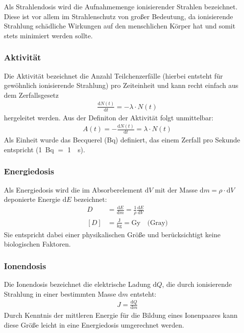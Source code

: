 \documentclass[11pt, a4paper]{article}
\numberwithin{equation}{section}
\begin{document}
Als Strahlendosis wird die Aufnahmemenge ionisierender Strahlen bezeichnet.
Diese ist vor allem im Strahlenschutz von großer Bedeutung, da ionisierende Strahlung schädliche Wirkungen auf den menschlichen Körper hat und somit stets minimiert werden sollte.

\subsubsection{Aktivität}
Die Aktivität bezeichnet die Anzahl Teilchenzerfälle (hierbei entsteht für gewöhnlich ionisierende Strahlung) pro Zeiteinheit und kann recht einfach aus dem Zerfallsgesetz
\begin{align}
	\frac{\mathrm{d} N(t)}{\mathrm{d} t} = - \lambda \cdot N(t)
\end{align}
hergeleitet werden.
Aus der Definiton der Aktivität folgt unmittelbar:
\begin{align}
	A(t) = - \frac{\mathrm{d} N(t)}{\mathrm{d} t} = \lambda \cdot N(t)
\end{align}
Als Einheit wurde das Becquerel (Bq) definiert, das einem Zerfall pro Sekunde entspricht (\SI{1}{Bq} $=$ \SI{1}{\per\second}).

\subsubsection{Energiedosis}
\label{sec:enegiedosis}
Als Energiedosis wird die im Absorberelement $\mathrm{d}V$ mit der Masse $\mathrm{d} m = \rho \cdot \mathrm{d}V$ deponierte Energie $\mathrm{d}E$ bezeichnet:
\begin{align}
	D &= \frac{\mathrm{d}E}{\mathrm{d}m} = \frac{1}{\rho}\frac{\mathrm{d}E}{\mathrm{d}V}\\
	[D] &= \frac{\mathrm{J}}{\mathrm{kg}} = \mathrm{Gy} \quad \text{(Gray)}
\end{align}
Sie entspricht dabei einer physikalischen Größe und berücksichtigt keine biologischen Faktoren.

\subsubsection{Ionendosis}
\label{sec:ionendosis}
Die Ionendosis bezeichnet die elektrische Ladung $\mathrm{d}Q$, die durch ionisierende Strahlung in einer bestimmten Masse $\mathrm{d}m$ entsteht:
\begin{align}
	J = \frac{\mathrm{d}Q}{\mathrm{d}m}
\end{align}
Durch Kenntnis der mittleren Energie für die Bildung eines Ionenpaares kann diese Größe leicht in eine Energiedosis umgerechnet werden.
\end{document}
